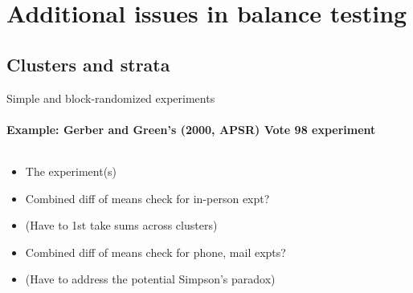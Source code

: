 

\section{Additional issues in balance testing}

\subsection{Clusters and strata}
\begin{frame}{Simple and block-randomized experiments}
\framesubtitle{Example: Gerber and Green's (2000, APSR) Vote 98
  experiment}

\begin{columns}
  \begin{Column}[.3\textwidth]
    \begin{itemize}[<+->]
    \item The experiment(s)
    \item Combined diff of means check for in-person expt?
    \item (Have to 1st take sums across clusters)
    \item Combined diff of means check for phone, mail  expts?
    \item (Have to address the potential Simpson's paradox)
    \end{itemize}
  \end{Column}
  \begin{Column}[.7\textwidth]
  \end{Column}
\end{columns}
  
\end{frame}

\itnote{
\item 
}



